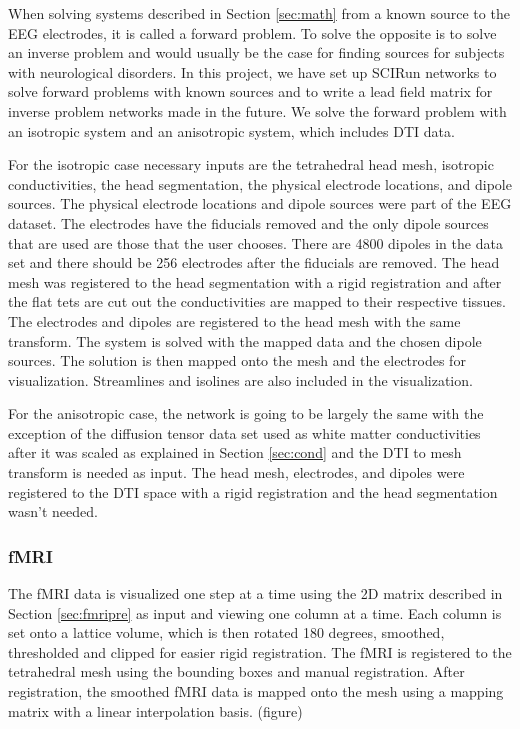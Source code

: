 When solving systems described in Section \ref {sec:math} from a known source to the EEG electrodes, it is called a forward problem. To solve the opposite is to solve an inverse problem and would usually be the case for finding sources for subjects with neurological disorders. In this project, we have set up SCIRun networks to solve forward problems with known sources and to write a lead field matrix for inverse problem networks made in the future. We solve the forward problem with an isotropic system and an anisotropic system, which includes DTI data. 

For the isotropic case necessary inputs are the tetrahedral head mesh, isotropic conductivities, the head segmentation, the physical electrode locations, and dipole sources. The physical electrode locations and dipole sources were part of the EEG dataset. The electrodes have the fiducials removed and the only dipole sources that are used are those that the user chooses. There are 4800 dipoles in the data set and there should be 256 electrodes after the fiducials are removed. The head mesh was registered to the head segmentation with a rigid registration and after the flat tets are cut out the conductivities are mapped to their respective tissues. The electrodes and dipoles are registered to the head mesh with the same transform. The system is solved with the mapped data and the chosen dipole sources. The solution is then mapped onto the mesh and the electrodes for visualization. Streamlines and isolines are also included in the visualization.

For the anisotropic case, the network is going to be largely the same with the exception of the diffusion tensor data set used as white matter conductivities after it was scaled as explained in Section \ref{sec:cond} and the DTI to mesh transform is needed as input. The head mesh, electrodes, and dipoles were registered to the DTI space with a rigid registration and the head segmentation wasn't needed. 

\subsubsection{fMRI}

The fMRI data is visualized one step at a time using the 2D matrix described in Section \ref{sec:fmripre} as input and viewing one column at a time. Each column is set onto a lattice volume, which is then rotated 180 degrees, smoothed, thresholded and clipped for easier rigid registration. The fMRI is registered to the tetrahedral mesh using the bounding boxes and manual registration. After registration, the smoothed fMRI data is mapped onto the mesh using a mapping matrix with a linear interpolation basis. (figure)

